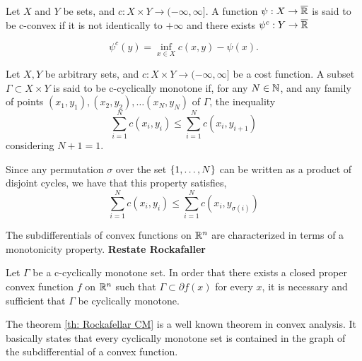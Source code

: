 \begin{definition}[c-transform]
	Let $X$ and $Y$ be sets, and $c:X\times Y \rightarrow (-\infty, \infty]$. A function $\psi: X\rightarrow \overline{\mathbb{R}}$ is said to be c-convex if it is not identically to $+\infty$ and there exists $\psi^c: Y \rightarrow \overline{\mathbb{R}}$
	
	\begin{equation}
		\psi^c(y)= \inf_{x\in X} c(x,y)-\psi(x).
	\end{equation}
\end{definition}

\begin{definition}
	Let $X , Y$ be arbitrary sets, and $c:X\times Y \rightarrow (-\infty, \infty]$ be a cost function. A subset $\Gamma \subset X \times Y$ is said to be c-cyclically monotone if, for any $N\in\mathbb{N}$, and any family of points $(x_1, y_1), (x_2, y_2), \dots (x_N, y_N)$ of $\Gamma$, the inequality
	\begin{equation*}
		\sum_{i=1}^{N} c(x_i, y_i) \leq \sum_{i=1}^{N} c(x_i, y_{i+1}) 
	\end{equation*} 
	considering $N+1=1$. 
\end{definition}
Since any permutation $\sigma$ over the set $\left\lbrace 1, \dots, N \right\rbrace$ can be written as a product of disjoint cycles, we have that this property satisfies,
\begin{equation}
		\sum_{i=1}^{N} c(x_i, y_i) \leq \sum_{i=1}^{N} c(x_i, y_{\sigma(i)}) 
\end{equation}


The subdifferentials  of convex functions on $\mathbb{R}^n$ are characterized in terms of a monotonicity property. \textbf{Restate Rockafaller}

\begin{theorem}[Rockafellar]
\label{th: Rockafellar CM}
Let $\Gamma$ be a c-cyclically monotone set. In order that there exists a closed proper convex function $f$ on $\mathbb{R}^n$ such that $\Gamma \subset \partial f(x) $ for  every $x$, it is necessary and sufficient that $\Gamma$ be cyclically monotone. 
\end{theorem}

The theorem \ref{th: Rockafellar CM} is a well known theorem in convex analysis. It basically states that every cyclically monotone set is contained in the graph of the subdifferential of a convex function.


